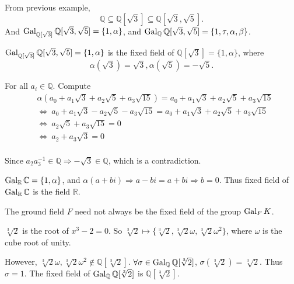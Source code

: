 \begin{example}
    From previous example,
    \[
        \mathbb{Q} \subseteq \mathbb{Q}[\sqrt{3}] \subseteq \mathbb{Q}[\sqrt{3}, \sqrt{5}].
    \]
    And $\operatorname{Gal}_{\mathbb{Q}[\sqrt{3}]} \mathbb{Q}[\sqrt{3}, \sqrt{5}] = \{ 1, \alpha \}$, 
    and $\operatorname{Gal}_{\mathbb{Q}} \mathbb{Q}[\sqrt{3}, \sqrt{5}] = \{1, \tau, \alpha, \beta \}$.
\end{example}

\begin{example}
    $\operatorname{Gal}_{\mathbb{Q}[\sqrt{3}]} \mathbb{Q}[\sqrt{3}, \sqrt{5}] = \{ 1, \alpha \}$ is the fixed 
    field of $\mathbb{Q}[\sqrt{3}] = \{ 1, \alpha \}$, where 
    \[
        \alpha(\sqrt{3}) = \sqrt{3}, \alpha(\sqrt{5}) = -\sqrt{5}.
    \]
\end{example}
\begin{solution}
    For all $a_i \in \mathbb{Q}$. Compute
    \begin{align*}
        &\alpha (a_0 + a_1 \sqrt{3} + a_2 \sqrt{5} + a_3 \sqrt{15}) = a_0 + a_1 \sqrt{3} + a_2 \sqrt{5} + a_3 \sqrt{15}\\
        &\Longleftrightarrow \> a_0 + a_1 \sqrt{3} - a_2 \sqrt{5} - a_3 \sqrt{15} = a_0 + a_1 \sqrt{3} + a_2 \sqrt{5} + a_3 \sqrt{15}\\
        &\Longleftrightarrow \> a_2 \sqrt{5} + a_3 \sqrt{15} = 0\\
        &\Longleftrightarrow \> a_2 + a_3 \sqrt{3} = 0\\
    \end{align*}
    
    Since $a_2a^{-1}_3 \in \mathbb{Q} \Longrightarrow -\sqrt{3} \in \mathbb{Q}$, which is a contradiction. 
\end{solution}

\begin{example}
    $\operatorname{Gal}_{\mathbb{R}} \mathbb{C} = \{ 1, \alpha \}$, and $\alpha(a + bi) \Longrightarrow a - bi = a+ bi \Longrightarrow b =0$. 
    Thus fixed field of $\operatorname{Gal}_{\mathbb{R}} \mathbb{C}$ is the field $\mathbb{R}$.
\end{example}

\begin{remark}
    The ground field $F$ need not always be the fixed field of the group $\operatorname{Gal}_F K$.
\end{remark}

\begin{example}
    $\sqrt[3]{2}$ is the root of $x^3 - 2 = 0$. So $\sqrt[3]{2} \mapsto \{ \sqrt[3]{2}, \sqrt[3]{2} \omega, \sqrt[3]{2} \omega^2 \}$, 
    where $\omega$ is the cube root of unity.

    However, $\sqrt[3]{2} \omega, \sqrt[3]{2} \omega^2 \notin \mathbb{Q}[\sqrt[3]{2}]$. $\forall \sigma \in \operatorname{Gal}_\mathbb{Q} \mathbb{Q}[\sqrt[3]{2}]$,
    $\sigma(\sqrt[3]{2}) = \sqrt[3]{2}$. Thus $\sigma = 1$. The fixed field of $\operatorname{Gal}_\mathbb{Q} \mathbb{Q}[\sqrt[3]{2}]$ is 
    $\mathbb{Q}[\sqrt[3]{2}]$.
\end{example}

